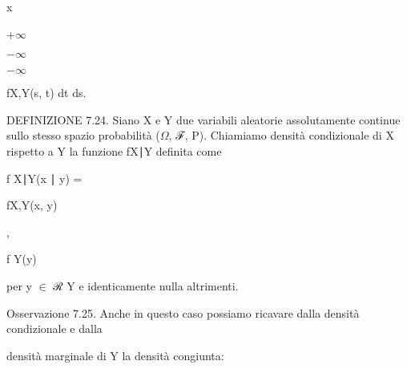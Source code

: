 \documentclass[a4paper,portrait,12pt]{article}
\begin{document}
\begin{flushleft}
x
\end{flushleft}





+$\infty$





$-$$\infty$





$-$$\infty$





\begin{flushleft}
fX,Y(s, t) dt ds.
\end{flushleft}





\begin{flushleft}
DEFINIZIONE 7.24. Siano X e Y due variabili aleatorie assolutamente continue sullo stesso spazio probabilit\`{a} ($\Omega$, ℱ, P). Chiamiamo densit\`{a} condizionale di X rispetto a Y la funzione fX∣Y definita come
\end{flushleft}


\begin{flushleft}
f X∣Y(x ∣ y) =
\end{flushleft}





\begin{flushleft}
fX,Y(x, y)
\end{flushleft}


,


\begin{flushleft}
f Y(y)
\end{flushleft}





\begin{flushleft}
per y $\in$ ℛ Y e identicamente nulla altrimenti.
\end{flushleft}


\begin{flushleft}
Osservazione 7.25. Anche in questo caso possiamo ricavare dalla densit\`{a} condizionale e dalla
\end{flushleft}


\begin{flushleft}
densit\`{a} marginale di Y la densit\`{a} congiunta:
\end{flushleft}
\end{document}
